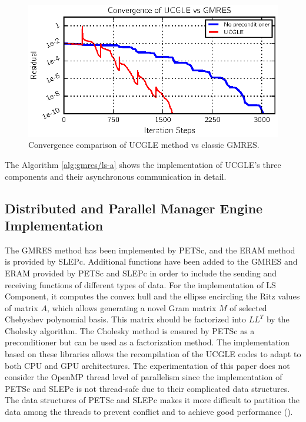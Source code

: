 \begin{figure}[htbp]
	\centering
	\includegraphics[width=6.2in]{fig/conv.eps}
	\caption{Convergence comparison of UCGLE method vs classic GMRES.}
	\label{fig:conv}
\end{figure}

The Algorithm \ref{alg:gmres/ls-a} shows the implementation of UCGLE's three components and their asynchronous communication in detail. 

\subsection{Distributed and Parallel Manager Engine Implementation}\label{Distributed and Parallel Manager Engine Implementation}

The GMRES method has been implemented by PETSc, and the ERAM method is provided by SLEPc. Additional functions have been added to the GMRES and ERAM provided by PETSc and SLEPc in order to include the sending and receiving functions of different types of data. For the implementation of LS Component, it computes the convex hull and the ellipse encircling the Ritz values of matrix $A$, which allows generating a novel Gram matrix $M$ of selected Chebyshev polynomial basis. This matrix should be factorized into $LL^T$ by the Cholesky algorithm. The Cholesky method is ensured by PETSc as a preconditioner but can be used as a factorization method. The implementation based on these libraries allows the recompilation of the UCGLE codes to adapt to both CPU and GPU architectures. The experimentation of this paper does not consider the OpenMP thread level of parallelism since the implementation of PETSc and SLEPc is not thread-safe due to their complicated data structures. The data structures of PETSc and SLEPc makes it more difficult to partition the data among the threads to prevent conflict and to achieve good performance (\cite{petsc-user-ref}).

